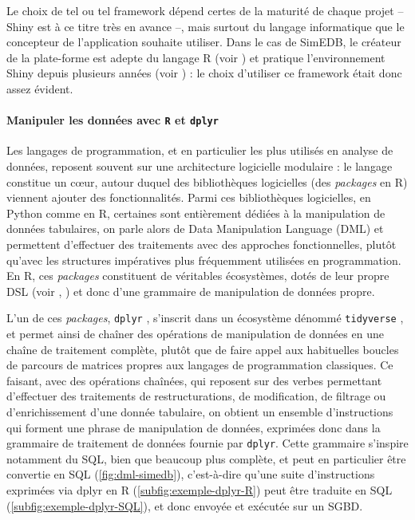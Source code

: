 	Le choix de tel ou tel framework dépend certes de la maturité de chaque projet -- Shiny est à ce titre très en avance --, mais surtout du langage informatique que le concepteur de l'application souhaite utiliser.
	Dans le cas de SimEDB, le créateur de la plate-forme est adepte du langage R (voir \cite{commenges_r_2014}) et pratique l'environnement Shiny depuis plusieurs années (voir \cite{cura_creer_2015}) : le choix d'utiliser ce framework était donc assez évident.	
	
	\paragraph*{Manipuler les données avec \texttt{R} et \texttt{dplyr}}
	
	Les langages de programmation, et en particulier les plus utilisés en analyse de données, reposent souvent sur une architecture logicielle modulaire : le langage constitue un cœur, autour duquel des bibliothèques logicielles (des \textit{packages} en R) viennent ajouter des fonctionnalités.
	Parmi ces bibliothèques logicielles, en Python comme en R, certaines sont entièrement dédiées à la manipulation de données tabulaires, on parle alors de \og Data Manipulation Language\fg{} (DML) et permettent d'effectuer des traitements avec des approches fonctionnelles, plutôt qu'avec les structures impératives plus fréquemment utilisées en programmation.
	En R, ces \textit{packages} constituent de véritables écosystèmes, dotés de leur propre DSL (voir , ) et donc d'une grammaire de manipulation de données propre.
	
	L'un de ces \textit{packages}, \texttt{dplyr} \autocite{wickham_dplyr_2015}, s'inscrit dans un écosystème dénommé \texttt{tidyverse} \autocite{wickham_tidyverse_2017}, et permet ainsi de chaîner des opérations de manipulation de données en une chaîne de traitement complète, plutôt que de faire appel aux habituelles boucles de parcours de matrices propres aux langages de programmation classiques.
	Ce faisant, avec des opérations chaînées, qui reposent sur des \og verbes\fg{} permettant d'effectuer des traitements de restructurations, de modification, de filtrage ou d'enrichissement d'une donnée tabulaire, on obtient un ensemble d'instructions qui forment une \og phrase\fg{} de manipulation de données, exprimées donc dans la \og grammaire de traitement de données\fg{} fournie par \texttt{dplyr}.
	Cette \og grammaire\fg{} s'inspire notamment du SQL, bien que beaucoup plus complète, et peut en particulier être \og convertie\fg{} en SQL (\cref{fig:dml-simedb}), c'est-à-dire qu'une suite d'instructions exprimées via dplyr en R (\cref{subfig:exemple-dplyr-R}) peut être traduite en SQL (\cref{subfig:exemple-dplyr-SQL}), et donc envoyée et exécutée sur un SGBD.
	
